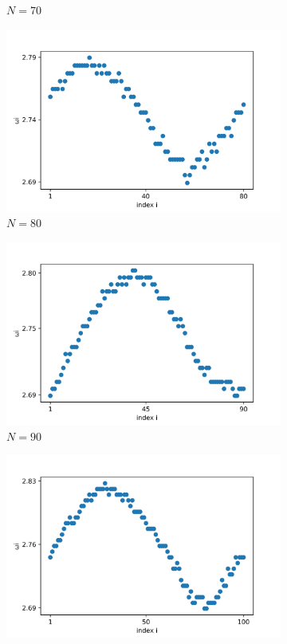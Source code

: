 \documentclass[a4paper,12pt]{article}
\begin{document}
\begin{figure}[H]
\begin{subfigure}{.32\textwidth}
  \caption{$N=70$}
\end{subfigure}
\begin{subfigure}{.32\textwidth}
  \centering
  \includegraphics[width=1\linewidth]{w_N=80.png}  
  \caption{$N=80$}
\end{subfigure}
\hfill
\begin{subfigure}{.32\textwidth}
  \centering
  \includegraphics[width=1\linewidth]{w_N=90.png}  
  \caption{$N=90$}
\end{subfigure}
\hfill
\begin{subfigure}{.32\textwidth}
  \centering
  \includegraphics[width=1\linewidth]{w_N=100.png}  

\end{subfigure}
\end{figure}
\end{document}
